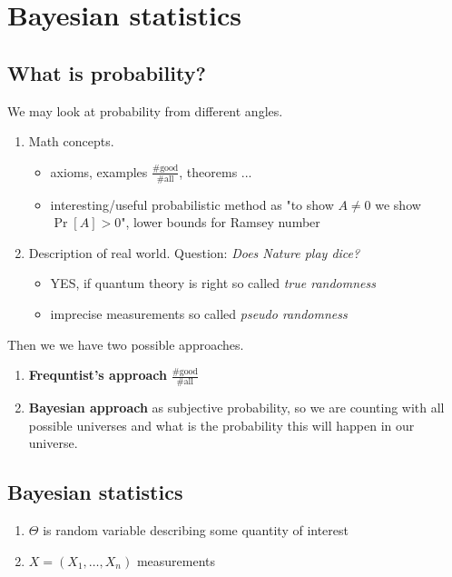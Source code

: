 \chapter{Bayesian statistics}

\section{What is probability?}

We may look at probability from different angles.

\begin{enumerate}
	\item Math concepts.
	\begin{itemize}
		\item axioms, examples $\frac{\# \text{good}}{\#\text{all}}$, theorems ...
		\item interesting/useful probabilistic method as "to show $A \neq 0$ we show $\Pr[A] >0$", lower bounds for Ramsey number
	\end{itemize}
	\item Description of real world. Question: \textit{Does Nature play dice?}
	\begin{itemize}
		\item YES, if quantum theory is right so called \textit{true randomness}
		\item imprecise measurements so called \textit{pseudo randomness}
	\end{itemize}
\end{enumerate}

Then we we have two possible approaches.

\begin{enumerate}
	\item \textbf{Frequntist's approach} $\frac{\text{\# good}}{\text{\# all}}$
	\item \textbf{Bayesian approach} as subjective probability, so we are counting with all possible universes and what is the probability this will happen in our universe.
\end{enumerate}

\section{Bayesian statistics}

\begin{enumerate}
	\item $\Theta$ is random variable describing some quantity of interest
	\item $X = (X_{1}, \dots, X_{n})$ measurements
\end{enumerate}

